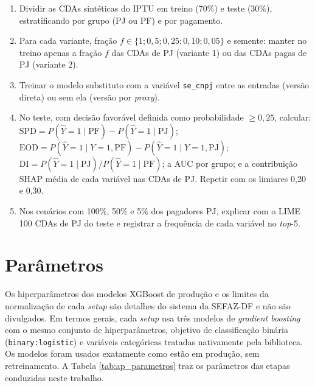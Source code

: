 \begin{apendicesenv}
\begin{enumerate}
    \item Dividir as CDAs sintéticas do IPTU em treino (70\%) e teste (30\%), estratificando por grupo (PJ ou PF) e por pagamento.
    \item Para cada variante, fração $f \in \{1; 0{,}5; 0{,}25; 0{,}10; 0{,}05\}$ e semente: manter no treino apenas a fração $f$ das CDAs de PJ (variante 1) ou das CDAs pagas de PJ (variante 2).
    \item Treinar o modelo substituto com a variável \texttt{se\_cnpj} entre as entradas (versão direta) ou sem ela (versão por \textit{proxy}).
    \item No teste, com decisão favorável definida como probabilidade $\ge 0{,}25$, calcular: $\mathrm{SPD} = P(\hat Y{=}1\mid \mathrm{PF}) - P(\hat Y{=}1\mid \mathrm{PJ})$; $\mathrm{EOD} = P(\hat Y{=}1\mid Y{=}1,\mathrm{PF}) - P(\hat Y{=}1\mid Y{=}1,\mathrm{PJ})$; $\mathrm{DI} = P(\hat Y{=}1\mid \mathrm{PJ}) / P(\hat Y{=}1\mid \mathrm{PF})$; a AUC por grupo; e a contribuição SHAP média de cada variável nas CDAs de PJ. Repetir com os limiares 0,20 e 0,30.
    \item Nos cenários com 100\%, 50\% e 5\% dos pagadores PJ, explicar com o LIME 100 CDAs de PJ do teste e registrar a frequência de cada variável no \textit{top}-5.
\end{enumerate}

\chapter{Parâmetros}
\label{ap:parametros}

Os hiperparâmetros dos modelos XGBoost de produção e os limites da normalização de cada \textit{setup} são detalhes do sistema da SEFAZ-DF e não são divulgados. Em termos gerais, cada \textit{setup} usa três modelos de \textit{gradient boosting} com o mesmo conjunto de hiperparâmetros, objetivo de classificação binária (\texttt{binary:logistic}) e variáveis categóricas tratadas nativamente pela biblioteca. Os modelos foram usados exatamente como estão em produção, sem retreinamento. A Tabela \ref{tab:ap_parametros} traz os parâmetros das etapas conduzidas neste trabalho.


\end{apendicesenv}
